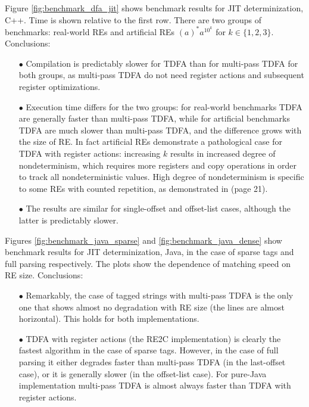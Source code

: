 \documentclass[]{article}
\begin{document}
\FloatBarrier

Figure \ref{fig:benchmark_dfa_jit} shows benchmark results for JIT determinization, C++.
Time is shown relative to the first row.
There are two groups of benchmarks: real-world REs and artificial REs $(a)^* a^{10^k}$ for $k \in \{1, 2, 3 \}$.
Conclusions:
\medskip

\begin{itemize}

\item[$\bullet$]
Compilation is predictably slower for TDFA than for multi-pass TDFA for both groups,
as multi-pass TDFA do not need register actions and subsequent register optimizations.
\medskip

\item[$\bullet$]
Execution time differs for the two groups:
for real-world benchmarks TDFA are generally faster than multi-pass TDFA,
while for artificial benchmarks TDFA are much slower than multi-pass TDFA, and the difference grows with the size of RE.
In fact artificial REs demonstrate a pathological case for TDFA with register actions:
increasing $k$ results in increased degree of nondeterminism,
which requires more registers and copy operations in order to track all nondeterministic values.
High degree of nondeterminism is specific to some REs with counted repetition, as demonstrated in \cite{Tro17} (page 21).
\medskip

\item[$\bullet$]
The results are similar for single-offset and offset-list cases,
although the latter is predictably slower.
\medskip

\end{itemize}

\medskip

Figures \ref{fig:benchmark_java_sparse} and \ref{fig:benchmark_java_dense} show benchmark results for JIT determinization, Java,
in the case of sparse tags and full parsing respectively.
The plots show the dependence of matching speed on RE size.
Conclusions:
\medskip
\begin{itemize}

\item[$\bullet$]
Remarkably, the case of tagged strings with multi-pass TDFA is the only one that shows almost no degradation with RE size (the lines are almost horizontal).
This holds for both implementations.
\medskip

\item[$\bullet$]
TDFA with register actions (the RE2C implementation) is clearly the fastest algorithm in the case of sparse tags.
However, in the case of full parsing it either degrades faster than multi-pass TDFA (in the last-offset case),
or it is generally slower (in the offset-list case).
For pure-Java implementation multi-pass TDFA is almost always faster than TDFA with register actions.
\medskip

\end{itemize}
\end{document}
